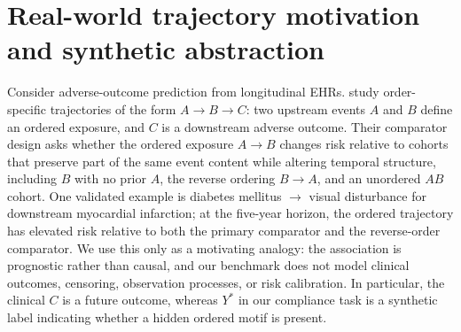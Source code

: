 \documentclass{article} %
\theoremstyle{plain}
\theoremstyle{definition}
\theoremstyle{remark}
\begin{document}
\begin{table}[tb]
\centering
\caption{Purpose of appendix analyses.}
\end{table}

\section{Real-world trajectory motivation and synthetic abstraction}
\label{app:illustrative}

Consider adverse-outcome prediction from longitudinal EHRs. 
\citet{edelman2026order_specific_ehr} study order-specific trajectories of the form \(A\to B\to C\): two upstream events \(A\) and \(B\) define an ordered exposure, and \(C\) is a downstream adverse outcome. Their comparator design asks whether the ordered exposure \(A\to B\) changes risk relative to cohorts that preserve part of the same event content while altering temporal structure, including \(B\) with no prior \(A\), the reverse ordering \(B\to A\), and an unordered \(AB\) cohort. One validated example is diabetes mellitus \(\to\) visual disturbance for downstream myocardial infarction; at the five-year horizon, the ordered trajectory has elevated risk relative to both the primary comparator and the reverse-order comparator. We use this only as a motivating analogy: the association is prognostic rather than causal, and our benchmark does not model clinical outcomes, censoring, observation processes, or risk calibration. In particular, the clinical \(C\) is a future outcome, whereas \(Y^*\) in our compliance task is a synthetic label indicating whether a hidden ordered motif is present.
\end{document}
